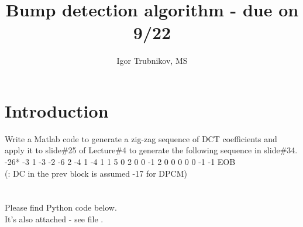 \documentclass[14pt, letterpaper]{article}
\title{Bump detection algorithm - due on 9/22}
\author{Igor Trubnikov, MS}
\begin{document}
\maketitle
\tableofcontents
\newpage

\section{Introduction}
Write a Matlab code to generate a zig-zag sequence of DCT coefficients and apply it to slide\#25
of Lecture\#4 to generate the following sequence in slide\#34.\\
-26* -3 1 -3 -2 -6 2 -4 1 -4 1 1 5 0 2 0 0 -1 2 0 0 0 0 0 -1 -1 EOB\\
(: DC in the prev block is assumed -17 for DPCM)\\\\
\\Please find Python code below.\\
It's also attached - see file .
%

\newpage
\end{document}
